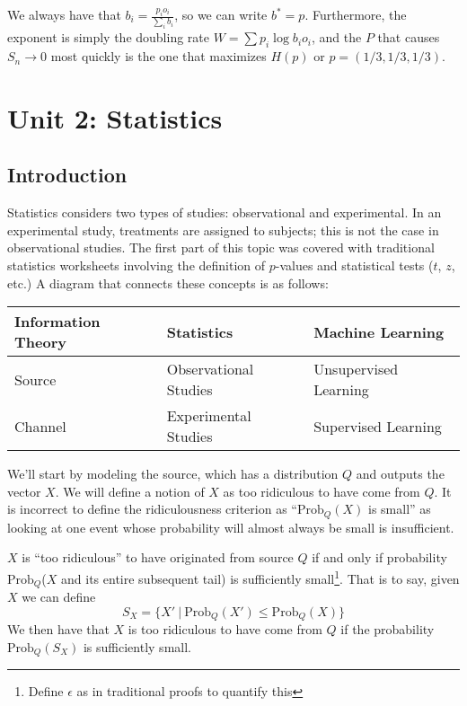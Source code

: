 \documentclass[11pt]{article}
\theoremstyle{definition}
\begin{document}
We always have that $b_i = \frac{p_i o_i}{\sum_i b_i}$, so we can write $b^* = p$. Furthermore, the exponent is simply the doubling rate $W = \sum p_i \log b_i o_i$, and the $P$ that causes $S_n \rightarrow 0$ most quickly is the one that maximizes $H(p)$ or $p = (1/3, 1/3, 1/3)$. 
\section{Unit 2: Statistics}

\subsection{Introduction}
Statistics considers two types of studies: observational and experimental. In an experimental study, treatments are assigned to subjects; this is not the case in observational studies. The first part of this topic was covered with traditional statistics worksheets involving the definition of $p$-values and statistical tests ($t$, $z$, etc.) A diagram that connects these concepts is as follows:

\begin{table}[ht]
\centering
\begin{tabular}{@{}lll@{}}
\toprule
Information Theory & Statistics            & Machine Learning      \\ \midrule
Source             & Observational Studies & Unsupervised Learning \\
Channel            & Experimental Studies  & Supervised Learning   \\ \bottomrule
\end{tabular}
\end{table}

We'll start by modeling the source, which has a distribution $Q$ and outputs the vector $X$. We will define a notion of $X$ as too ridiculous to have come from $Q$. It is incorrect to define the ridiculousness criterion as ``$\text{Prob}_Q(X)$ is small'' as looking at one event whose probability will almost always be small is insufficient.

 $X$ is ``too ridiculous'' to have originated from source $Q$ if and only if probability $\text{Prob}_Q$($X$ and its entire subsequent tail) is sufficiently small\footnote{Define $\epsilon$ as in traditional proofs to quantify this}. That is to say, given $X$ we can define 
\begin{equation*}
S_X = \{ X' \: | \: \text{Prob}_Q (X') \leq \text{Prob}_Q(X) \}
\end{equation*}We then have that $X$ is too ridiculous to have come from $Q$ if the probability $\text{Prob}_Q(S_X)$ is sufficiently small.
\end{document}
